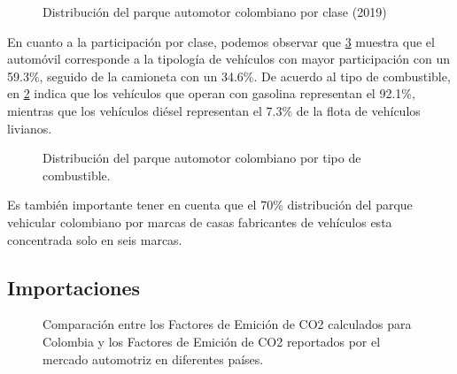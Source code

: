  \begin{figure}[htbp]
   \centering
   
    \caption{Distribución del parque automotor colombiano por clase (2019) \cite{ICCT_Performance_2020}}
    \label{fig:linebaseclase}
\end{figure}

En cuanto a la participación por clase, podemos observar que \ref{fig:linebaseclase} muestra que el automóvil corresponde a la tipología de vehículos con mayor participación con un 59.3\%, seguido de la camioneta con un 34.6\%. De acuerdo al tipo de combustible, en \ref{fig:linebasecomb} indica que los vehículos que operan con gasolina representan el 92.1\%, mientras que los vehículos diésel representan el 7.3\% de la flota de vehículos livianos.

 \begin{figure}[htbp]
   \centering
   
    \caption{Distribución del parque automotor colombiano por tipo de combustible. \cite{ICCT_Performance_2020}}
    \label{fig:linebasecomb}
\end{figure}

Es también importante tener en cuenta que el 70\% distribución del parque vehicular colombiano por marcas de casas fabricantes de vehículos esta  concentrada solo en seis marcas.

\subsection{Importaciones}

\begin{figure}[htbp]
   \centering
   
    \caption{Comparación entre los Factores de Emición de CO2 calculados para Colombia y los Factores de Emición de CO2 reportados por el mercado automotriz en diferentes países. \cite{ICCT_Performance_2020}}
    \label{fig:linebaseclase}
\end{figure}

